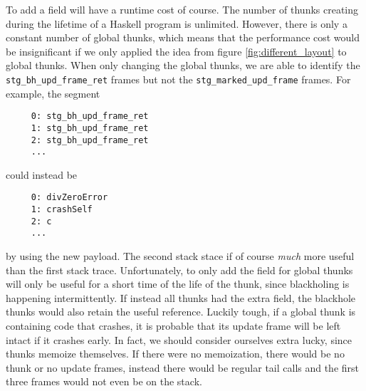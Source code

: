 \begin{figure}
\end{figure}

To add a field will have a runtime cost of course. The number of thunks
creating during the lifetime of a Haskell program is unlimited. However,
there is only a constant number of global thunks, which means that the
performance cost would be insignificant if we only applied the idea from
figure \ref{fig:different_layout} to global thunks. When
only changing the global thunks, we are able to identify
the \texttt{stg\_bh\_upd\_frame\_ret} frames but not the
\texttt{stg\_marked\_upd\_frame} frames. For example, the
segment

\begin{verbatim}
     0: stg_bh_upd_frame_ret
     1: stg_bh_upd_frame_ret
     2: stg_bh_upd_frame_ret
     ...
\end{verbatim}

could instead be

\begin{verbatim}
     0: divZeroError
     1: crashSelf
     2: c
     ...
\end{verbatim}

by using the new payload. The second stack stace if of course
\emph{much} more useful than the first stack trace. Unfortunately,
to only add the field for global thunks will only be useful for a
short time of the life of the thunk, since blackholing is happening
intermittently. If instead all thunks had the extra field, the blackhole
thunks would also retain the useful reference. Luckily tough, if a
global thunk is containing code that crashes, it is probable that its
update frame will be left intact if it crashes early. In
fact, we should consider ourselves extra lucky, since thunks
memoize themselves. If there were no memoization,
there would be no thunk or no update frames, instead there would be
regular tail calls and the first three frames would not even be on the stack.

